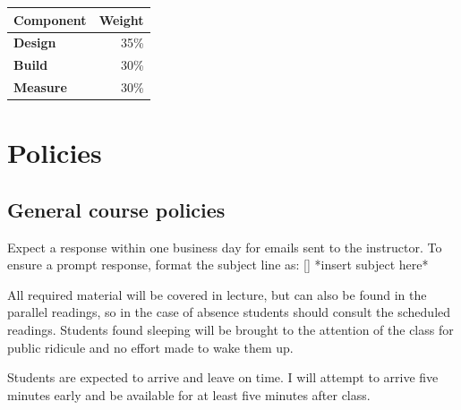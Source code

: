\documentclass{syllabus}
\begin{document}
\noindent\begin{tabular}{lr}
\textbf{Component} & \textbf{Weight}       \\ \hline
\textbf{Design}      & 35\%  \\
\textbf{Build}           & 30\%       \\
\textbf{Measure}            & 30\%     
\end{tabular}%






\section*{Policies}
\subsection{General course policies}
Expect a response within one business day for emails sent to the instructor. To ensure a prompt response, format the subject line as: [\coursecode] *insert subject here*

All required material will be covered in lecture, but can also be found in the parallel readings, so in the case of absence students should consult the scheduled readings. Students found sleeping will be brought to the attention of the class for public ridicule and no effort made to wake them up.

Students are expected to arrive and leave on time. I will attempt to arrive five minutes early and be available for at least five minutes after class.


\end{document}
